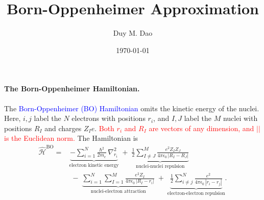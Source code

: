 \documentclass[11pt]{article}      %
\title{Born-Oppenheimer Approximation}
\author{Duy M. Dao}
\date{\today}                      %
\numberwithin{equation}{section}   %
\begin{document}
\maketitle                         %

\newpage

\paragraph{The Born-Oppenheimer Hamiltonian.}
The \textcolor{blue}{Born-Oppenheimer (BO) Hamiltonian} omits the kinetic
energy of the nuclei. Here, $i,j$ label the $N$ electrons with
positions $r_i$, and $I,J$ label the $M$ nuclei with positions $R_I$ and
charges $Z_I e$. \textcolor{red}{Both $r_i$ and $R_I$ are vectors of any dimension, and
$||$ is the Euclidean norm.} The Hamiltonian is
\begin{equation}
    \boxed{
    \begin{aligned}
        \hat{\mathcal{H}}^{\mathrm{BO}}
        ={}& \underbrace{-\sum_{i=1}^{N}\frac{\hbar^2}{2m_e}\,\nabla_{r_i}^{2}}_{\text{electron kinetic energy}}
        \;+\; \underbrace{\frac{1}{2}\sum_{I\neq J}^{M}
        \frac{e^2 Z_I Z_J}{4\pi\epsilon_0\,|R_I-R_J|}}_{\text{nuclei-nuclei repulsion}} \\[6pt]
        &\;-\; \underbrace{\sum_{i=1}^{N}\sum_{I=1}^{M}
        \frac{e^2 Z_I}{4\pi\epsilon_0\,|R_I-r_i|}}_{\text{nuclei-electron attraction}}
        \;+\; \underbrace{\frac{1}{2}\sum_{i\neq j}^{N}
        \frac{e^2}{4\pi\epsilon_0\,|r_i-r_j|}}_{\text{electron-electron repulsion}}.
    \end{aligned}}
\end{equation}
\end{document}
